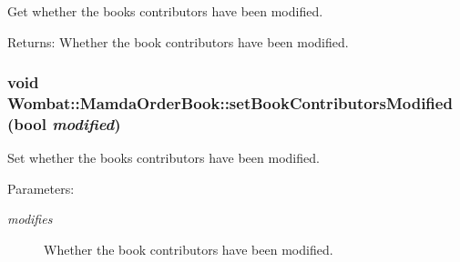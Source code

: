 Get whether the books contributors have been modified. 

\begin{Desc}
\item[Returns:]Whether the book contributors have been modified. \end{Desc}
\hypertarget{classWombat_1_1MamdaOrderBook_e1c1720e4858fc3f37addd9ce469b8aa}{
\subsubsection[setBookContributorsModified]{\setlength{\rightskip}{0pt plus 5cm}void Wombat::Mamda\-Order\-Book::set\-Book\-Contributors\-Modified (bool {\em modified})}}
\label{classWombat_1_1MamdaOrderBook_e1c1720e4858fc3f37addd9ce469b8aa}


Set whether the books contributors have been modified. 

\begin{Desc}
\item[Parameters:]
\begin{description}
\item[{\em modifies}]Whether the book contributors have been modified. \end{description}
\end{Desc}
